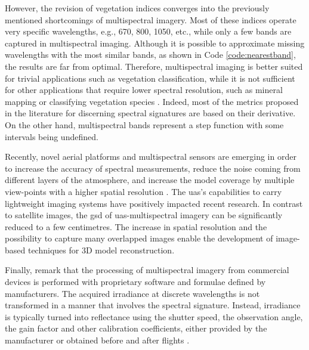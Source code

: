 However, the revision of vegetation indices converges into the previously mentioned shortcomings of multispectral imagery. Most of these indices operate very specific wavelengths, e.g., 670, 800, 1050, etc., while only a few bands are captured in multispectral imaging. Although it is possible to approximate missing wavelengths with the most similar bands, as shown in Code \ref{code:nearestband}, the results are far from optimal. Therefore, multispectral imaging is better suited for trivial applications such as vegetation classification, while it is not sufficient for other applications that require lower spectral resolution, such as mineral mapping or classifying vegetation species \cite{navulur_multispectral_2006, pu_hyperspectral_2017}. Indeed, most of the metrics proposed in the literature for discerning spectral signatures are based on their derivative. On the other hand, multispectral bands represent a step function with some intervals being undefined.



Recently, novel aerial platforms and multispectral sensors are emerging in order to increase the accuracy of spectral measurements, reduce the noise coming from different layers of the atmosphere, and increase the model coverage by multiple view-points with a higher spatial resolution \cite{deng_uav-based_2018}. The \acrshort{uas}’s capabilities to carry lightweight imaging systems have positively impacted recent research. In contrast to satellite images, the \acrshort{gsd} of \acrshort{uas}-multispectral imagery can be significantly reduced to a few centimetres. The increase in spatial resolution and the possibility to capture many overlapped images enable the development of image-based techniques for 3D model reconstruction.

Finally, remark that the processing of multispectral imagery from commercial devices is performed with proprietary software and formulae defined by manufacturers. The acquired irradiance at discrete wavelengths is not transformed in a manner that involves the spectral signature. Instead, irradiance is typically turned into reflectance using the shutter speed, the observation angle, the gain factor and other calibration coefficients, either provided by the manufacturer or obtained before and after flights \cite{jurado_semantic_2020, candiago_evaluating_2015}.

